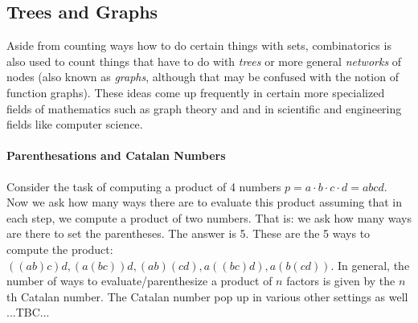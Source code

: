 
\subsection{Trees and Graphs}
Aside from counting ways how to do certain things with sets, combinatorics is also used to count things that have to do with \emph{trees} or more general \emph{networks} of nodes (also known as \emph{graphs}, although that may be confused with the notion of function graphs). These ideas come up frequently in certain more specialized fields of mathematics such as graph theory and and in scientific and engineering fields like computer science.



\paragraph{Parenthesations and Catalan Numbers}
Consider the task of computing a product of 4 numbers $p = a \cdot b \cdot c  \cdot d = abcd$. Now we ask how many ways there are to evaluate this product assuming that in each step, we compute a product of two numbers. That is: we ask how many ways are there to set the parentheses. The answer is 5. These are the 5 ways to compute the product: $((ab)c)d, (a(bc))d, (ab)(cd), a((bc)d), a(b(cd))$. In general, the number of ways to evaluate/parenthesize a product of $n$ factors is given by the $n$th Catalan number. The Catalan number pop up in various other settings as well  ...TBC...






